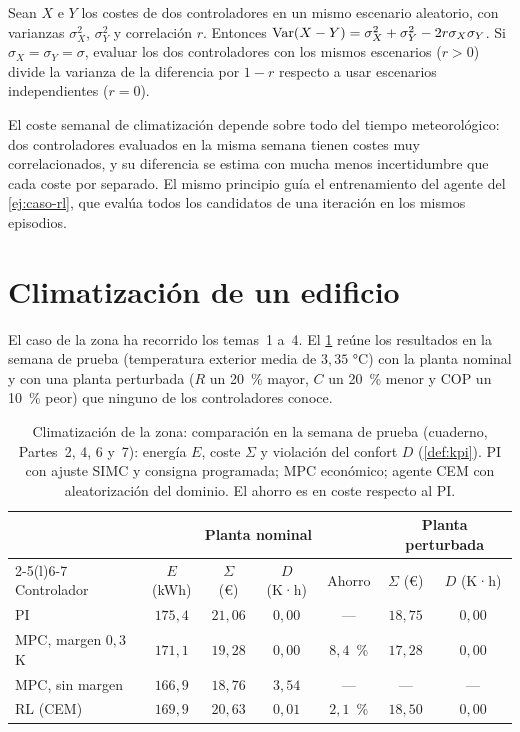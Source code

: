 \begin{proposicion}\label{prop:crn}
Sean $X$ e $Y$ los costes de dos controladores en un mismo escenario aleatorio, con varianzas $\sigma_X^{2}$, $\sigma_Y^{2}$ y correlación $r$. Entonces $\operatorname{Var}(X-Y)=\sigma_X^{2}+\sigma_Y^{2}-2r\sigma_X\sigma_Y$. Si $\sigma_X=\sigma_Y=\sigma$, evaluar los dos controladores con los mismos escenarios ($r>0$) divide la varianza de la diferencia por $1-r$ respecto a usar escenarios independientes ($r=0$).
\end{proposicion}

El coste semanal de climatización depende sobre todo del tiempo meteorológico: dos controladores evaluados en la misma semana tienen costes muy correlacionados, y su diferencia se estima con mucha menos incertidumbre que cada coste por separado. El mismo principio guía el entrenamiento del agente del \cref{ej:caso-rl}, que evalúa todos los candidatos de una iteración en los mismos episodios.

\section{Climatización de un edificio}

El caso de la zona ha recorrido los temas~1 a~4. El \cref{tab:hvac} reúne los resultados en la semana de prueba (temperatura exterior media de $3{,}35$ °C) con la planta nominal y con una planta perturbada ($R$ un 20~\% mayor, $C$ un 20~\% menor y COP un 10~\% peor) que ninguno de los controladores conoce.

\begin{table}[htbp]
\centering\small
\begin{tabular}{@{}lcccccc@{}}
\toprule
& \multicolumn{4}{c}{Planta nominal} & \multicolumn{2}{c}{Planta perturbada} \\
\cmidrule(lr){2-5}\cmidrule(l){6-7}
Controlador & $E$ (kWh) & $\Sigma$ (€) & $D$ (K·h) & Ahorro & $\Sigma$ (€) & $D$ (K·h) \\
\midrule
PI & $175{,}4$ & $21{,}06$ & $0{,}00$ & --- & $18{,}75$ & $0{,}00$ \\
MPC, margen $0{,}3$ K & $171{,}1$ & $19{,}28$ & $0{,}00$ & $8{,}4$~\% & $17{,}28$ & $0{,}00$ \\
MPC, sin margen & $166{,}9$ & $18{,}76$ & $3{,}54$ & --- & --- & --- \\
RL (CEM) & $169{,}9$ & $20{,}63$ & $0{,}01$ & $2{,}1$~\% & $18{,}50$ & $0{,}00$ \\
\bottomrule
\end{tabular}
\caption{Climatización de la zona: comparación en la semana de prueba (cuaderno, Partes~2, 4, 6 y~7): energía $E$, coste $\Sigma$ y violación del confort $D$ (\cref{def:kpi}). PI con ajuste SIMC y consigna programada; MPC económico; agente CEM con aleatorización del dominio. El ahorro es en coste respecto al PI.}
\label{tab:hvac}
\end{table}

